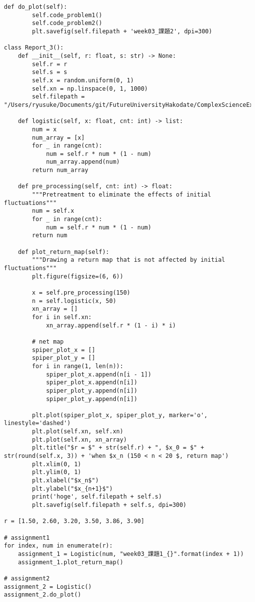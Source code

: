 \documentclass[a4j]{jsarticle}
\begin{document}
\begin{lstlisting}[caption=Pythonによる課題１と課題２の描画]
    def do_plot(self):
        self.code_problem1()
        self.code_problem2()
        plt.savefig(self.filepath + 'week03_課題2', dpi=300)

class Report_3():
    def __init__(self, r: float, s: str) -> None:
        self.r = r
        self.s = s
        self.x = random.uniform(0, 1)
        self.xn = np.linspace(0, 1, 1000)
        self.filepath = "/Users/ryusuke/Documents/git/FutureUniversityHakodate/ComplexScienceExercise/result/"

    def logistic(self, x: float, cnt: int) -> list:
        num = x
        num_array = [x]
        for _ in range(cnt):
            num = self.r * num * (1 - num)
            num_array.append(num)
        return num_array

    def pre_processing(self, cnt: int) -> float:
        """Pretreatment to eliminate the effects of initial fluctuations"""
        num = self.x
        for _ in range(cnt):
            num = self.r * num * (1 - num)
        return num

    def plot_return_map(self):
        """Drawing a return map that is not affected by initial fluctuations"""
        plt.figure(figsize=(6, 6))

        x = self.pre_processing(150)
        n = self.logistic(x, 50)
        xn_array = []
        for i in self.xn:
            xn_array.append(self.r * (1 - i) * i)

        # net map
        spiper_plot_x = []
        spiper_plot_y = []
        for i in range(1, len(n)):
            spiper_plot_x.append(n[i - 1])
            spiper_plot_x.append(n[i])
            spiper_plot_y.append(n[i])
            spiper_plot_y.append(n[i])

        plt.plot(spiper_plot_x, spiper_plot_y, marker='o', linestyle='dashed')
        plt.plot(self.xn, self.xn)
        plt.plot(self.xn, xn_array)
        plt.title("$r = $" + str(self.r) + ", $x_0 = $" + str(round(self.x, 3)) + 'when $x_n (150 < n < 20 $, return map')
        plt.xlim(0, 1)
        plt.ylim(0, 1)
        plt.xlabel("$x_n$")
        plt.ylabel("$x_{n+1}$")
        print('hoge', self.filepath + self.s)
        plt.savefig(self.filepath + self.s, dpi=300)

r = [1.50, 2.60, 3.20, 3.50, 3.86, 3.90]

# assignment1
for index, num in enumerate(r):
    assignment_1 = Logistic(num, "week03_課題1_{}".format(index + 1))
    assignment_1.plot_return_map()

# assignment2
assignment_2 = Logistic()
assignment_2.do_plot()
\end{lstlisting}
\end{document}
